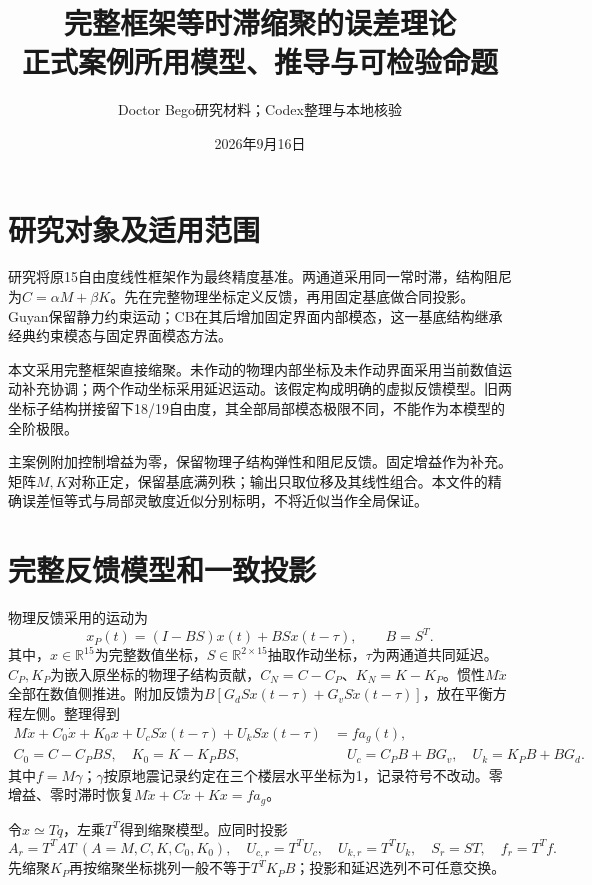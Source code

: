 \documentclass[UTF8,11pt,a4paper]{ctexart}
\title{完整框架等时滞缩聚的误差理论\\\large 正式案例所用模型、推导与可检验命题}
\author{Doctor Bego研究材料；Codex整理与本地核验}
\date{2026年9月16日}
\begin{document}
\maketitle

\section{研究对象及适用范围}
研究将原15自由度线性框架作为最终精度基准。两通道采用同一常时滞，结构阻尼为$C=\alpha M+\beta K$。先在完整物理坐标定义反馈，再用固定基底做合同投影。Guyan保留静力约束运动；CB在其后增加固定界面内部模态，这一基底结构继承经典约束模态与固定界面模态方法\cite{craig1968}。

本文采用完整框架直接缩聚。未作动的物理内部坐标及未作动界面采用当前数值运动补充协调；两个作动坐标采用延迟运动。该假定构成明确的虚拟反馈模型。旧两坐标子结构拼接留下18/19自由度，其全部局部模态极限不同，不能作为本模型的全阶极限。

主案例附加控制增益为零，保留物理子结构弹性和阻尼反馈。固定增益作为补充。矩阵$M,K$对称正定，保留基底满列秩；输出只取位移及其线性组合。本文件的精确误差恒等式与局部灵敏度近似分别标明，不将近似当作全局保证。

\section{完整反馈模型和一致投影}
物理反馈采用的运动为
\begin{equation}\label{eq:xp}
x_P(t)=(I-BS)x(t)+BSx(t-\tau),\qquad B=S^T.
\end{equation}
其中，$x\in\mathbb R^{15}$为完整数值坐标，$S\in\mathbb R^{2\times15}$抽取作动坐标，$\tau$为两通道共同延迟。$C_P,K_P$为嵌入原坐标的物理子结构贡献，$C_N=C-C_P$、$K_N=K-K_P$。惯性$M\ddot x$全部在数值侧推进。附加反馈为$B[G_dSx(t-\tau)+G_vS\dot x(t-\tau)]$，放在平衡方程左侧。整理得到
\begin{align}
 M\ddot x+C_0\dot x+K_0x+U_cS\dot x(t-\tau)+U_kSx(t-\tau)&=f a_g(t),\label{eq:eom}\\
 C_0=C-C_PBS,\quad K_0=K-K_PBS,&\quad
 U_c=C_PB+BG_v,\quad U_k=K_PB+BG_d.\label{eq:coeff}
\end{align}
其中$f=M\gamma$；$\gamma$按原地震记录约定在三个楼层水平坐标为1，记录符号不改动。零增益、零时滞时恢复$M\ddot x+C\dot x+Kx=f a_g$。

令$x\simeq Tq$，左乘$T^T$得到缩聚模型。应同时投影
\begin{equation}\label{eq:projection}
 A_r=T^TAT\ (A=M,C,K,C_0,K_0),\quad U_{c,r}=T^TU_c,\quad
 U_{k,r}=T^TU_k,\quad S_r=ST,\quad f_r=T^Tf.
\end{equation}
先缩聚$K_P$再按缩聚坐标挑列一般不等于$T^TK_PB$；投影和延迟选列不可任意交换。
\end{document}
